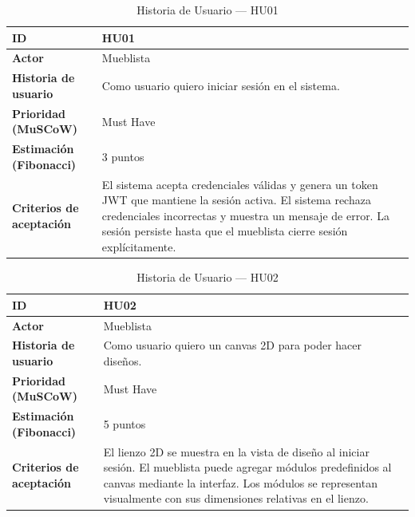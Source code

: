 ﻿\documentclass{iccmemoria}
\begin{document}
\begin{table}[H]
\centering
\caption{Historia de Usuario — HU01}
\begin{tabular}{|p{4.5cm}|p{9.5cm}|}
\hline
\textbf{ID} & HU01 \\
\hline
\textbf{Actor} & Mueblista \\
\hline
\textbf{Historia de usuario} & Como usuario quiero iniciar sesión en el sistema. \\
\hline
\textbf{Prioridad (MuSCoW)} & Must Have \\
\hline
\textbf{Estimación (Fibonacci)} & 3 puntos \\
\hline
\textbf{Criterios de aceptación} & El sistema acepta credenciales válidas y genera un token JWT que mantiene la sesión activa.\newline
El sistema rechaza credenciales incorrectas y muestra un mensaje de error.\newline
La sesión persiste hasta que el mueblista cierre sesión explícitamente. \\
\hline
\end{tabular}
\end{table}

\begin{table}[H]
\centering
\caption{Historia de Usuario — HU02}
\begin{tabular}{|p{4.5cm}|p{9.5cm}|}
\hline
\textbf{ID} & HU02 \\
\hline
\textbf{Actor} & Mueblista \\
\hline
\textbf{Historia de usuario} & Como usuario quiero un canvas 2D para poder hacer diseños. \\
\hline
\textbf{Prioridad (MuSCoW)} & Must Have \\
\hline
\textbf{Estimación (Fibonacci)} & 5 puntos \\
\hline
\textbf{Criterios de aceptación} & El lienzo 2D se muestra en la vista de diseño al iniciar sesión.\newline
El mueblista puede agregar módulos predefinidos al canvas mediante la interfaz.\newline
Los módulos se representan visualmente con sus dimensiones relativas en el lienzo. \\
\hline
\end{tabular}
\end{table}
\end{document}
